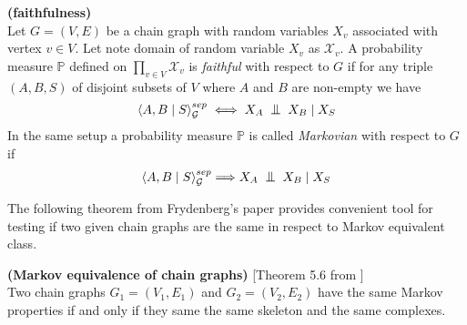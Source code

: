 \begin{defi} \label{faithDef} {\textbf{(faithfulness)}} \\
	Let $G = (V, E)$ be a chain graph with random variables $X_v$ associated with vertex $v \in V$. Let note domain of 
	random variable $X_v$ as $\mathcal{X}_v$. A probability measure $\mathbb{P}$ 
	defined on $\prod_{v \in V} \mathcal{X}_v$ is \textit{faithful} with respect to $G$ if 
	for any triple $(A, B, S)$ of disjoint subsets of $V$ where $A$ and $B$ are non-empty we have
	\begin{equation}
		\cSep{A}{B}{S}{G} \iff X_A \bigCI X_B \mid X_S
	\end{equation}
	In the same setup a probability measure $\mathbb{P}$ is called \textit{Markovian} with respect to $G$ if
	\begin{equation}
		\cSep{A}{B}{S}{G} \Longrightarrow X_A \bigCI X_B \mid X_S
	\end{equation}
\end{defi}
The following theorem from Frydenberg's paper \cite{CGMP} provides convenient tool for testing if two given 
chain graphs are the same in respect to Markov equivalent class.

\begin{prop} {\textbf{(Markov equivalence of chain graphs)} [Theorem 5.6 from \cite{CGMP}]} \\
	Two chain graphs $G_1 = (V_1, E_1)$ and $G_2 = (V_2, E_2)$ have the same Markov properties if and only if they same 
	the same skeleton and the same complexes.
\end{prop}	



